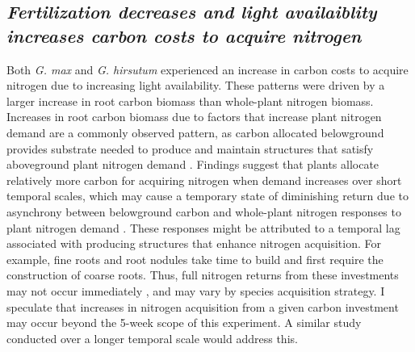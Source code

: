 \subsection{\textit{Fertilization decreases and light availaiblity increases carbon costs to acquire nitrogen}}
Both \textit{G. max} and \textit{G. hirsutum} experienced an increase in carbon costs to acquire nitrogen due to increasing light availability. These patterns were driven by a larger increase in root carbon biomass than whole-plant nitrogen biomass. Increases in root carbon biomass due to factors that increase plant nitrogen demand are a commonly observed pattern, as carbon allocated belowground provides substrate needed to produce and maintain structures that satisfy aboveground plant nitrogen demand . Findings suggest that plants allocate relatively more carbon for acquiring nitrogen when demand increases over short temporal scales, which may cause a temporary state of diminishing return due to asynchrony between belowground carbon and whole-plant nitrogen responses to plant nitrogen demand . These responses might be attributed to a temporal lag associated with producing structures that enhance nitrogen acquisition. For example, fine roots  and root nodules  take time to build and first require the construction of coarse roots. Thus, full nitrogen returns from these investments may not occur immediately , and may vary by species acquisition strategy. I speculate that increases in nitrogen acquisition from a given carbon investment may occur beyond the 5-week scope of this experiment. A similar study conducted over a longer temporal scale would address this.

